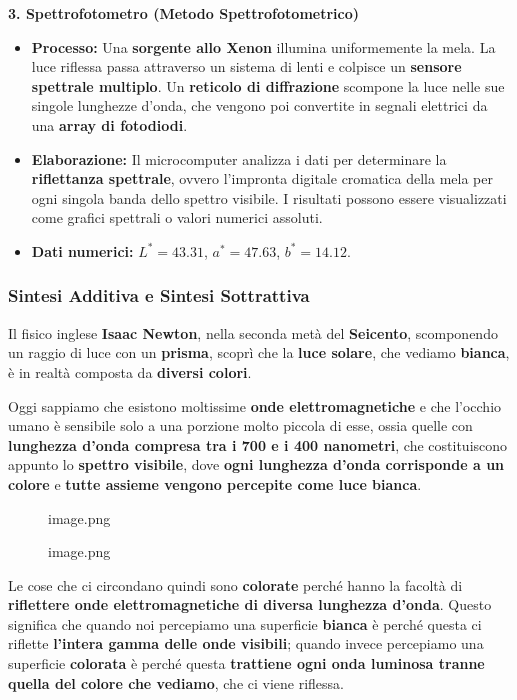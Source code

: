 \documentclass[
]{article}
\providecommand{\tightlist}{%
  \setlength{\itemsep}{0pt}\setlength{\parskip}{0pt}}
\begin{document}
\textbf{3. Spettrofotometro (Metodo Spettrofotometrico)}

\begin{itemize}
\tightlist
\item
  \textbf{Processo:} Una \textbf{sorgente allo Xenon} illumina uniformemente la mela. La luce riflessa passa attraverso un sistema di lenti e colpisce un \textbf{sensore spettrale multiplo}. Un \textbf{reticolo di diffrazione} scompone la luce nelle sue singole lunghezze d'onda, che vengono poi convertite in segnali elettrici da una \textbf{array di fotodiodi}.
\item
  \textbf{Elaborazione:} Il microcomputer analizza i dati per determinare la \textbf{riflettanza spettrale}, ovvero l'impronta digitale cromatica della mela per ogni singola banda dello spettro visibile. I risultati possono essere visualizzati come grafici spettrali o valori numerici assoluti.
\item
  \textbf{Dati numerici:} \(L^* = 43.31\), \(a^*= 47.63\), \(b^* = 14.12\).
\end{itemize}

\hypertarget{sintesi-additiva-e-sintesi-sottrattiva}{%
\subsubsection{Sintesi Additiva e Sintesi Sottrattiva}\label{sintesi-additiva-e-sintesi-sottrattiva}}

Il fisico inglese \textbf{Isaac Newton}, nella seconda metà del \textbf{Seicento}, scomponendo un raggio di luce con un \textbf{prisma}, scoprì che la \textbf{luce solare}, che vediamo \textbf{bianca}, è in realtà composta da \textbf{diversi colori}.

Oggi sappiamo che esistono moltissime \textbf{onde elettromagnetiche} e che l'occhio umano è sensibile solo a una porzione molto piccola di esse, ossia quelle con \textbf{lunghezza d'onda compresa tra i 700 e i 400 nanometri}, che costituiscono appunto lo \textbf{spettro visibile}, dove \textbf{ogni lunghezza d'onda corrisponde a un colore} e \textbf{tutte assieme vengono percepite come luce bianca}.

\begin{figure}
\centering
{image.png}
\caption{image.png}
\end{figure}

Le cose che ci circondano quindi sono \textbf{colorate} perché hanno la facoltà di \textbf{riflettere onde elettromagnetiche di diversa lunghezza d'onda}. Questo significa che quando noi percepiamo una superficie \textbf{bianca} è perché questa ci riflette \textbf{l'intera gamma delle onde visibili}; quando invece percepiamo una superficie \textbf{colorata} è perché questa \textbf{trattiene ogni onda luminosa tranne quella del colore che vediamo}, che ci viene riflessa.
\end{document}
